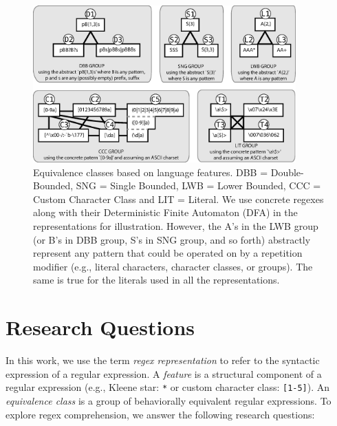 \begin{figure}[tb]
\centering
\includegraphics[width=0.90\textwidth]{illustrations/refactoringTree.eps}
\vspace{-6pt}
\caption{Equivalence classes based on language features. DBB = Double-Bounded, SNG = Single Bounded, LWB = Lower Bounded, CCC = Custom Character Class and LIT = Literal. We use concrete regexes along with their Deterministic Finite Automaton (DFA) in the representations for illustration. However, the A's in the LWB group (or B's in DBB group, S's in SNG group, and so forth) abstractly represent any pattern that could be operated on by a repetition modifier (e.g., literal characters, character classes, or groups). The same is true for the literals used in all the representations. }
\vspace{-6pt}
\label{fig:refactoringTree}
\end{figure}


\section{Research Questions}
\label{sec:study}

In this work, we use the term {\em regex representation} to refer to the syntactic expression of a regular expression. A \emph{feature} is a structural component of a regular expression  (e.g., Kleene star: \verb!*! or custom character class: \verb![1-5]!). An \emph{equivalence class} is a group of behaviorally equivalent regular expressions. 
To explore regex comprehension, we answer the following  research questions: \\

